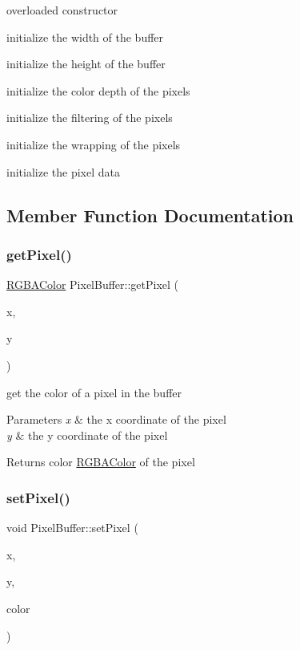 overloaded constructor 

initialize the width of the buffer

initialize the height of the buffer

initialize the color depth of the pixels

initialize the filtering of the pixels

initialize the wrapping of the pixels

initialize the pixel data 

\subsection{Member Function Documentation}
\mbox{\label{struct_pixel_buffer_a426b4dd17e4f9d45e107f0390c0e87a9}} 
\subsubsection{\texorpdfstring{get\+Pixel()}{getPixel()}}
{\footnotesize\ttfamily \hyperlink{struct_r_g_b_a_color}{R\+G\+B\+A\+Color} Pixel\+Buffer\+::get\+Pixel (\begin{DoxyParamCaption}\item[{int}]{x,  }\item[{int}]{y }\end{DoxyParamCaption})\hspace{0.3cm}{\ttfamily [inline]}}



get the color of a pixel in the buffer 


\begin{DoxyParams}{Parameters}
{\em x} & the x coordinate of the pixel \\
\hline
{\em y} & the y coordinate of the pixel \\
\hline
\end{DoxyParams}
\begin{DoxyReturn}{Returns}
color \hyperlink{struct_r_g_b_a_color}{R\+G\+B\+A\+Color} of the pixel 
\end{DoxyReturn}
\mbox{\label{struct_pixel_buffer_a538a6b35401764c0eae72c3744b05cd5}} 
\subsubsection{\texorpdfstring{set\+Pixel()}{setPixel()}}
{\footnotesize\ttfamily void Pixel\+Buffer\+::set\+Pixel (\begin{DoxyParamCaption}\item[{int}]{x,  }\item[{int}]{y,  }\item[{\hyperlink{struct_r_g_b_a_color}{R\+G\+B\+A\+Color}}]{color }\end{DoxyParamCaption})\hspace{0.3cm}{\ttfamily [inline]}}




